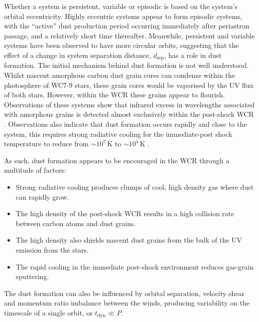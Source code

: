 \documentclass[fleqn,usenatbib]{mnras}
\newcommand{\rms}[1]{\ensuremath{_{\text{#1}}}}
\begin{document}
Whether a system is persistent, variable or episodic is based on the system's orbital eccentricity.
Highly eccentric systems appear to form episodic systems, with the ``active'' dust production period occurring immediately after periastron passage, and a relatively short time thereafter.
Meanwhile, persistent and variable systems have been observed to have more circular orbits, suggesting that the effect of a change in system separation distance, $d\rms{sep}$, has a role in dust formation.
The initial mechanism behind dust formation is not well understood.
Whilst nascent amorphous carbon dust grain cores can condense within the photosphere of WC7-9 stars,
these grain cores would be vaporised by the UV flux of both stars.
However, within the WCR these grains appear to flourish.
Observations of these systems show that infrared excess in wavelengths associated with amorphous grains is detected almost exclusively within the post-shock WCR \citep{soulainSPHEREViewWolfRayet2018}.
Observations also indicate that dust formation occurs rapidly and close to the system, this requires strong radiative cooling for the immediate-post shock temperature to reduce from $\sim 10^7 \, \si{\kelvin}$ to $\sim 10^4 \, \si{\kelvin}$
\citep{williamsInfraredPhotometryLatetype1987,williamsMultifrequencyVariationsWolfrayet1990}.

As such, dust formation appears to be encouraged in the WCR through a multitude of factors:

\begin{itemize}
  \item Strong radiative cooling produces clumps of cool, high density gas where dust can rapidly grow.
  \item The high density of the post-shock WCR results in a high collision rate between carbon atoms and dust grains.
  \item The high density also shields nascent dust grains from the bulk of the UV emission from the stars.
  \item The rapid cooling in the immediate post-shock environment reduces gas-grain sputtering.
\end{itemize}

\noindent
The dust formation can also be influenced by orbital separation, velocity shear and momentum ratio imbalance between the winds, producing variability on the timescale of a single orbit, or $t\rms{dyn} \ll P$.
\end{document}
